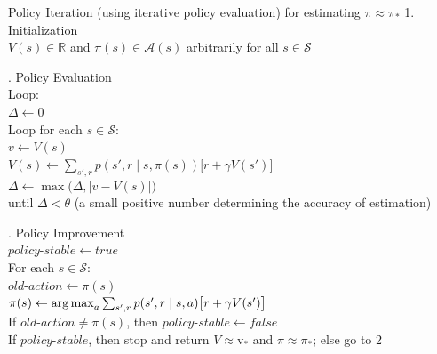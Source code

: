 \begin{algobox}{Policy Iteration (using iterative policy evaluation) for estimating $\pi \approx \pi_*$}
1. Initialization\\
\hspace*{1.5em}$V(s) \in \mathbb{R}$ and $\pi(s) \in \mathcal{A}(s)$ arbitrarily for all $s \in \mathcal{S}$

. Policy Evaluation\\
\hspace*{1.5em}Loop:\\
\hspace*{3em}$\Delta \leftarrow 0$\\
\hspace*{3em}Loop for each $s \in \mathcal{S}$:\\
\hspace*{4.5em}$v \leftarrow V(s)$\\
\hspace*{4.5em}$V(s) \leftarrow \sum_{s',r} p(s',r \mid s,\pi(s))\bigl[r + \gamma V(s')\bigr]$\\
\hspace*{4.5em}$\Delta \leftarrow \max\bigl(\Delta, \lvert v - V(s) \rvert\bigr)$\\
\hspace*{1.5em}until $\Delta < \theta$ (a small positive number determining the accuracy of estimation)

. Policy Improvement\\
\hspace*{1.5em}$\mathit{policy\text{-}stable} \leftarrow \mathit{true}$\\
\hspace*{1.5em}For each $s \in \mathcal{S}$:\\
\hspace*{3em}$\mathit{old\text{-}action} \leftarrow \pi(s)$\\
\hspace*{3em}$\pi(s) \leftarrow \operatorname*{arg\,max}_a \sum_{s',r} p(s',r \mid s,a)\bigl[r + \gamma V(s')\bigr]$\\
\hspace*{3em}If $\mathit{old\text{-}action} \neq \pi(s)$, then $\mathit{policy\text{-}stable} \leftarrow \mathit{false}$\\
\hspace*{1.5em}If $\mathit{policy\text{-}stable}$, then stop and return $V \approx \mathrm{v}_*$ and $\pi \approx \pi_*$; else go to 2
\end{algobox}

